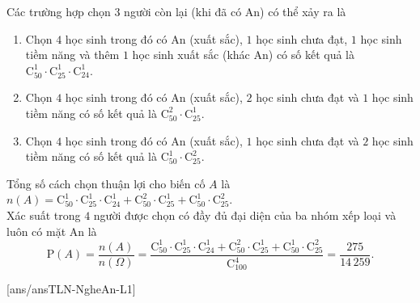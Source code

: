 \begin{ex}
{\begin{itemchoice}
			Các trường hợp chọn $3$ người còn lại (khi đã có An) có thể xảy ra là
			\begin{enumerate}[\it TH 1:]
				\item Chọn $4$ học sinh trong đó có An (xuất sắc), $1$ học sinh chưa đạt, $1$ học sinh tiềm năng và thêm $1$ học sinh xuất sắc (khác An) có số kết quả là $\mathrm{C}_{50}^1 \cdot \mathrm{C}_{25}^1 \cdot \mathrm{C}_{24}^1$.
				\item Chọn $4$ học sinh trong đó có An (xuất sắc), $2$ học sinh chưa đạt và $1$ học sinh tiềm năng có số kết quả là $\mathrm{C}_{50}^2 \cdot \mathrm{C}_{25}^1$.
				\item Chọn $4$ học sinh trong đó có An (xuất sắc), $1$ học sinh chưa đạt và $2$ học sinh tiềm năng có số kết quả là $\mathrm{C}_{50}^1 \cdot \mathrm{C}_{25}^2$.
			\end{enumerate}
			Tổng số cách chọn thuận lợi cho biến cố $A$ là $n(A) = \mathrm{C}_{50}^1 \cdot \mathrm{C}_{25}^1 \cdot \mathrm{C}_{24}^1 + \mathrm{C}_{50}^2 \cdot \mathrm{C}_{25}^1 + \mathrm{C}_{50}^1 \cdot \mathrm{C}_{25}^2$.\\
			Xác suất trong $4$ người được chọn có đầy đủ đại diện của ba nhóm xếp loại và luôn có mặt An là
			\[\mathrm{P}(A) = \dfrac{n(A)}{n(\Omega)}= \dfrac{\mathrm{C}_{50}^1 \cdot \mathrm{C}_{25}^1 \cdot \mathrm{C}_{24}^1 + \mathrm{C}_{50}^2 \cdot \mathrm{C}_{25}^1 + \mathrm{C}_{50}^1 \cdot \mathrm{C}_{25}^2}{\mathrm{C}_{100}^4} = \dfrac{275}{14\,259}.\]
		\end{itemchoice}
	}
\end{ex}
\caukq
\setcounter{ex}{0}
[ans/ansTLN-NgheAn-L1]
